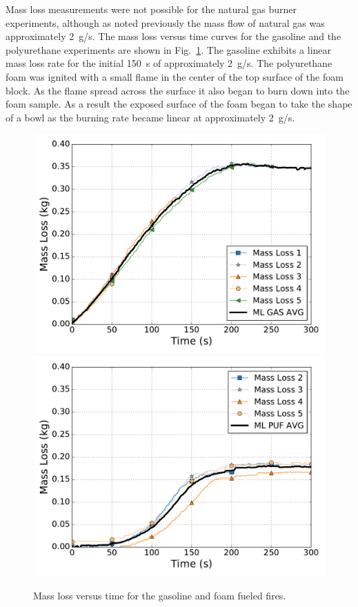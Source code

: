 \documentclass[twoside]{uocthesis}
\begin{document}
{Mass loss measurements were not possible for the natural gas burner experiments, although as noted previously the mass flow of natural gas was approximately 2~g/s.  The mass loss versus time curves for the gasoline and the polyurethane experiments are shown in Fig.~\ref{Mass}.  The gasoline exhibits a linear mass loss rate for the initial 150~s of approximately 2~g/s.  The polyurethane foam was ignited with a small flame in the center of the top surface of the foam block.  As the flame spread across the surface it also began to burn down into the foam sample.  As a result the exposed surface of the foam began to take the shape of a bowl as the burning rate became linear at approximately 2~g/s.

\begin{figure}[p]
  \centering
  \includegraphics[width=4.5in]{../Figures/ML_GAS}\\
  \includegraphics[width=4.5in]{../Figures/ML_PUF}\\
  \caption[Mass loss versus time for the gasoline and foam fueled fires]{Mass loss versus time for the gasoline and foam fueled fires.}
  \label{Mass}
\end{figure}


}
\end{document}
